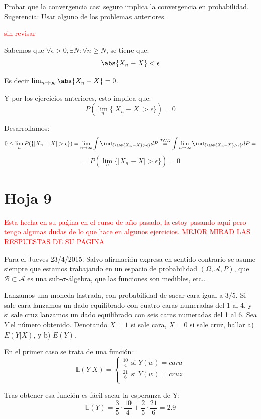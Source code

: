 \begin{problem}[10]Probar que la convergencia casi seguro implica la convergencia en probabilidad. Sugerencia: Usar alguno de los
problemas anteriores.


\solution
\textcolor{red}{sin revisar}

Sabemos que $\forall \epsilon > 0, \exists N: \forall n \geq N$, se tiene que:
\[
\abs{X_n -X} < \epsilon
\]

Es decir $\lim_{n \rightarrow \infty} \abs{X_n-X}=0$.

Y por los ejercicios anteriores, esto implica que:
\[
P(\lim_n\{ |X_n - X| > \epsilon\})= 0
\]

Desarrollamos:
\[
0 \leq \lim_n P(\{ |X_n - X| > \epsilon\})=\lim_{n \rightarrow \infty} \int  \ind_{\{\abs{X_n-X}>\epsilon\}} dP \stackrel{TCD}{=} \int \lim_{n \rightarrow \infty}  \ind_{\{\abs{X_n-X}>\epsilon\}} dP =
\]
\[
= P(\lim_n\{ |X_n - X| > \epsilon\})= 0
\]


\end{problem}

\newpage
\section{Hoja 9}
\textcolor{red}{Esta hecha en su paǵina en el curso de año pasado, la estoy pasando aquí pero tengo algunas dudas de lo que hace en algunos ejercicios. MEJOR MIRAD LAS RESPUESTAS DE SU PAGINA}

Para el Jueves 23/4/2015. Salvo afirmaci\'on expresa en sentido
contrario se asume siempre que estamos trabajando en un espacio de probabilidad $(\Omega, \mathcal{A}, P)$,
que  $\mathcal{B}\subset \mathcal{A}$ es una sub-$\sigma$-\'algebra, que las funciones son medibles, etc.. 

\begin{problem}[1]Lanzamos una moneda lastrada, con probabilidad de sacar cara
igual a $3/5$. Si sale cara lanzamos un dado equilibrado con cuatro
caras numeradas del 1 al 4, y si sale cruz lanzamos un dado
equilibrado con seis caras numeradas del 1 al 6. Sea $Y$ el n\'umero
obtenido. Denotando $X=1$ si sale cara, $X=0$ si sale cruz, hallar
a) $E(Y|X)$, y  b) $E(Y)$.

\solution

En el primer caso se trata de una función:
\[
\mathbb{E}(Y|X) =
  \left\lbrace
  \begin{array}{l}
  	  \frac{10}{4} \text{ si } Y(w) = cara\\
  	  \frac{21}{6} \text{ si } Y(w) = cruz\\
  \end{array}
  \right.
\]

Tras obtener esa función es fácil sacar la esperanza de Y:
\[
\mathbb{E}(Y)=\frac{3}{5}\cdot\frac{10}{4} + \frac{2}{5}\cdot\frac{21}{6} = 2.9
\]

\end{problem}



